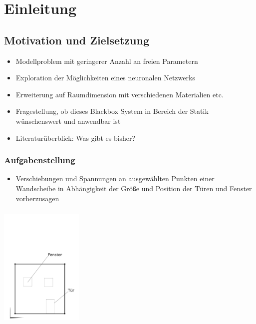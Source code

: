 

\chapter{Einleitung}
\label{einleitung}



\section{Motivation und Zielsetzung}

\begin{itemize}
    \item Modellproblem mit geringerer Anzahl an freien Parametern
    \item Exploration der Möglichkeiten eines neuronalen Netzwerks
    \item Erweiterung auf Raumdimension mit verschiedenen Materialien etc.
    \item Fragestellung, ob dieses Blackbox System in Bereich der Statik wünschenswert und anwendbar ist
    \item Literaturüberblick: Was gibt es bisher? 

\end{itemize}
\subsection{Aufgabenstellung}
\begin{itemize}
    \item Verschiebungen und Spannungen an ausgewählten Punkten einer Wandscheibe in Abhängigkeit der Größe und Position der Türen und Fenster vorherzusagen
\end{itemize}

\includegraphics[width = 4cm, height = 6cm]{fig/HausGrundbau.pdf}